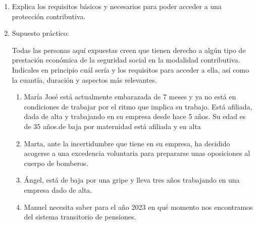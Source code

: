 \begin{enumerate}[label=\alph*)]
    \item Explica los requisitos básicos y necesarios para poder acceder a una protección contributiva.
    \item Supuesto práctico:

    Todas las personas aquí expuestas creen que tienen derecho a algún tipo de prestación económica de la seguridad social en la modalidad contributiva. Indícales en principio cuál sería y los requisitos para acceder a ella, así como la cuantía, duración y aspectos más relevantes.

    \begin{enumerate}
        \item María José está actualmente embarazada de 7 meses y ya no está en condiciones de trabajar por el ritmo que implica su trabajo. Está  afiliada, dada de alta y trabajando en su empresa desde hace 5 años. Su edad es de 35 años.de baja por maternidad  está afiliada y en alta
        \item Marta, ante la incertidumbre que tiene en su empresa, ha decidido acogerse a una excedencia voluntaria para prepararse unas oposiciones al cuerpo de bomberos.
        \item Ángel, está de baja por una gripe y lleva tres años trabajando en una empresa dado de alta.
        \item Manuel necesita saber para el año 2023 en qué momento nos encontramos del sistema transitorio de pensiones.
    \end{enumerate}
\end{enumerate}

